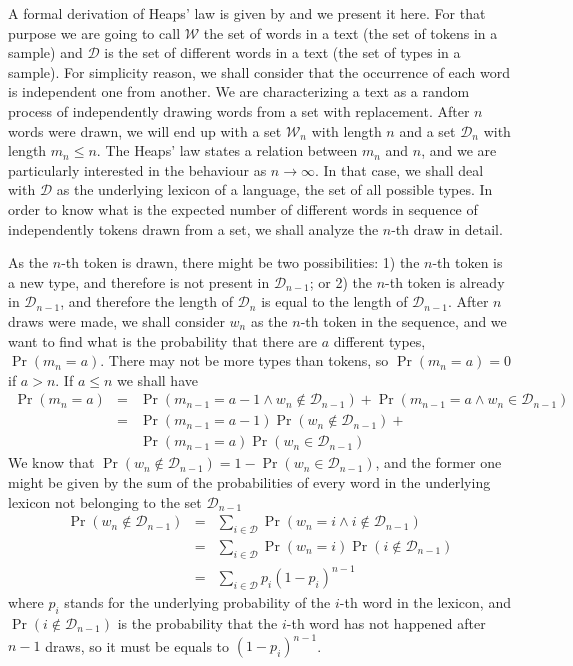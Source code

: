 A formal derivation of Heaps' law is given by \cite{vanLeijenhorst} and we present it here.
For that purpose we are going to call $\mathcal{W}$ the set of words in a text
(the set of tokens in a sample) and $\mathcal{D}$ is the set of different words in
a text (the set of types in a sample). For simplicity reason, we shall consider that
the occurrence of each word is independent one from another. We are characterizing 
a text as a random process of independently drawing words from a set with replacement.
After $n$ words were drawn, we will end up with a set $\mathcal{W}_n$ with length $n$
and a set $\mathcal{D}_n$ with length $m_n \leq n$. The Heaps' law states a relation
between $m_n$ and $n$, and we are particularly interested in the behaviour as $n \rightarrow \infty$.
In that case, we shall deal with $\mathcal{D}$ as the underlying lexicon of a language,
the set of all possible types. In order to know what is the expected number of different
words in sequence of independently tokens drawn from a set, we shall analyze the
$n$-th draw in detail. 

As the $n$-th token is drawn, there might be two possibilities: 1) the $n$-th token
is a new type, and therefore is not present in $\mathcal{D}_{n-1}$; or 2) the $n$-th token
is already in $\mathcal{D}_{n-1}$, and therefore the length of $\mathcal{D}_{n}$ 
is equal to the length of $\mathcal{D}_{n-1}$. After $n$ draws were made, we shall consider
$w_n$ as the $n$-th token in the sequence, and we want to
find what is the probability that there are $a$ different types, $\Pr (m_n = a)$.
There may not be more types than tokens, so $\Pr (m_n = a) = 0$ if $a>n$. 
If $a \leq n$ we shall have
\begin{eqnarray}
\Pr(m_n = a) &=& \Pr(m_{n-1} = a-1 \wedge w_n \notin \mathcal{D}_{n-1}) + 
                 \Pr(m_{n-1} = a \wedge w_n \in \mathcal{D}_{n-1}) \nonumber \\
             &=& \Pr(m_{n-1} = a-1) \Pr(w_n \notin \mathcal{D}_{n-1}) + \nonumber \\
             &&  \Pr(m_{n-1} = a) \Pr(w_n \in \mathcal{D}_{n-1})
\end{eqnarray}
We know that $\Pr(w_n \notin \mathcal{D}_{n-1}) = 1 - \Pr(w_n \in \mathcal{D}_{n-1})$, and the 
former one might be given by the sum of the probabilities of every word in the underlying lexicon
not belonging to the set $\mathcal{D}_{n-1}$
\begin{eqnarray}
\Pr(w_n \notin \mathcal{D}_{n-1}) &=& \sum_{i\in\mathcal{D}} \Pr(w_n = i \wedge i \notin \mathcal{D}_{n-1}) \nonumber \\
                                 &=& \sum_{i\in\mathcal{D}} \Pr(w_n = i) \Pr(i \notin \mathcal{D}_{n-1}) \nonumber \\
                                 &=& \sum_{i\in\mathcal{D}} p_i (1-p_i)^{n-1}
\end{eqnarray}
where $p_i$ stands for the underlying probability of the $i$-th word in the lexicon, and
$\Pr(i \notin \mathcal{D}_{n-1})$ is the probability that the $i$-th word has not happened
after $n-1$ draws, so it must be equals to $(1-p_i)^{n-1}$.

